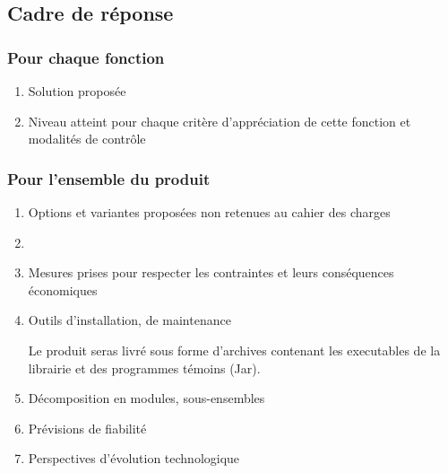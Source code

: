 \subsection{Cadre de réponse}

\subsubsection{Pour chaque fonction}
\begin{enumerate}
\item{Solution proposée}
\item{Niveau atteint pour chaque critère d’appréciation de cette fonction et modalités de contrôle}
\end{enumerate}

\subsubsection{Pour l’ensemble du produit}
\begin{enumerate}
\item{Options et variantes proposées non retenues au cahier des charges}

\item{}

\item{Mesures prises pour respecter les contraintes et leurs conséquences économiques}


\item{Outils d’installation, de maintenance}

Le produit seras livré sous forme d'archives contenant les executables de la librairie et des programmes témoins (Jar).


\item{Décomposition en modules, sous-ensembles}
\item{Prévisions de fiabilité}
\item{ Perspectives d’évolution technologique}
\end{enumerate}